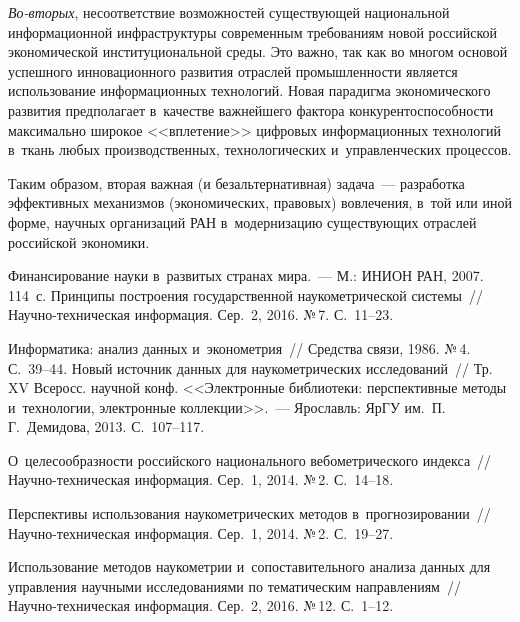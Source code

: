 \begin{multicols}{2}
\begin{enumerate}[1.]
    \textit{Во-вторых}, несоответствие возможностей существующей 
национальной информационной инфраструктуры современным требованиям 
новой российской экономической институциональной среды. Это важно, так 
как во многом основой успешного инновационного развития\linebreak
 отраслей 
промышленности является использование информационных технологий. Новая\linebreak 
парадиг\-ма экономического развития предполагает в~качестве важнейшего 
фактора конкурентоспособности максимально широкое <<вплетение>> 
цифровых информационных технологий в~ткань любых производственных, 
технологических и~управленческих процессов.
    
    Таким образом, вторая важная (и безальтернативная) задача~--- разработка 
эффективных механизмов (экономических, правовых) вовлечения, в~той или 
иной форме, научных организаций РАН в~модернизацию существующих 
отраслей российской экономики. 
    \end{enumerate}
    
   {\small\frenchspacing
 {%
 \begin{thebibliography}{99}
 Финансирование науки в~развитых странах 
мира.~--- М.: ИНИОН РАН, 2007. 114~с.
 Принципы построения государственной 
наукометрической системы~// На\-уч\-но-тех\-ни\-че\-ская информация. Сер.~2, 
2016. №\,7. С.~11--23.

 Информатика: анализ данных 
и~эконометрия~// Средства связи, 1986. №\,4. С.~39--44. 
 Новый источник данных для 
наукометрических исследований~// Тр. XV Всеросс.  
научной конф. <<Электронные библиотеки: перспективные 
методы и~технологии, электронные коллекции>>.~--- Ярославль: 
ЯрГУ им.\ П.\,Г.~Демидова, 2013. 
С.~107--117.


 О~целесообразности российского национального 
вебометрического индекса~// На\-уч\-но-тех\-ни\-че\-ская информация. Сер.~1, 
2014. №\,2. С.~14--18.

 Перспективы использования 
наукометрических методов в~прогнозировании~// На\-уч\-но-тех\-ни\-че\-ская 
информация. Сер.~1, 2014. №\,2. С.~19--27. 

 Использование методов 
наукометрии и~сопоставительного анализа данных для управления научными 
исследованиями по тематическим направлениям~// На\-уч\-но-тех\-ни\-че\-ская 
информация. Сер.~2, 2016. №\,12. С.~1--12. 


\end{thebibliography}}}
\end{multicols}
